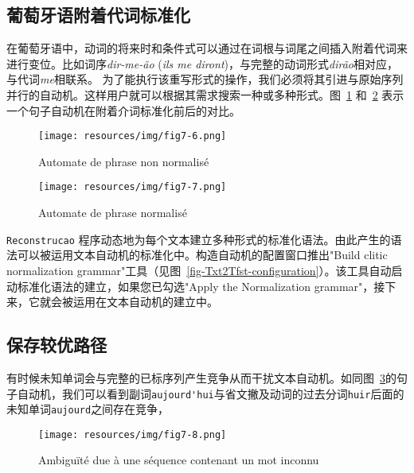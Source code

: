 \subsection{葡萄牙语附着代词标准化}
\label{section-portuguese-clitics}
在葡萄牙语中，动词的将来时和条件式可以通过在词根与词尾之间插入附着代词来进行变位。比如词序\textit{dir-me-ão} (\textit{ils me diront})，与完整的动词形式\textit{dirão}相对应，与代词\textit{me}相联系。
 为了能执行该重写形式的操作，我们必须将其引进与原始序列并行的自动机。这样用户就可以根据其需求搜索一种或多种形式。图~\ref{fig-1285-not-normalized} 和~\ref{fig-1285-normalized} 表示一个句子自动机在附着介词标准化前后的对比。


\begin{figure}[!ht]
\begin{center}
\texttt{[image: resources/img/fig7-6.png]}
\caption{Automate de phrase non normalisé\label{fig-1285-not-normalized}}
\end{center}
\end{figure}
\begin{figure}[!ht]
\begin{center}
\texttt{[image: resources/img/fig7-7.png]}
\caption{Automate de phrase normalisé\label{fig-1285-normalized}}
\end{center}
\end{figure}
\clearpage

\bigskip
\noindent  \verb+Reconstrucao+ 程序动态地为每个文本建立多种形式的标准化语法。由此产生的语法可以被运用文本自动机的标准化中。构造自动机的配置窗口推出"Build clitic normalization grammar"工具（见图~\ref{fig-Txt2Tfst-configuration}）。该工具自动启动标准化语法的建立，如果您已勾选"Apply the Normalization grammar"，接下来，它就会被运用在文本自动机的建立中。

\subsection{保存较优路径}
\label{section-keeping-best-paths}
有时候未知单词会与完整的已标序列产生竞争从而干扰文本自动机。如同图~\ref{fig-unknown-word-ambiguity}的句子自动机，我们可以看到副词\verb+aujourd'hui+与省文撇及动词的过去分词\verb+huir+后面的未知单词\verb+aujourd+之间存在竞争，



\begin{figure}[!ht]
\begin{center}
\texttt{[image: resources/img/fig7-8.png]}
\caption{Ambiguïté due à une séquence contenant un mot inconnu\label{fig-unknown-word-ambiguity}}
\end{center}
\end{figure}

